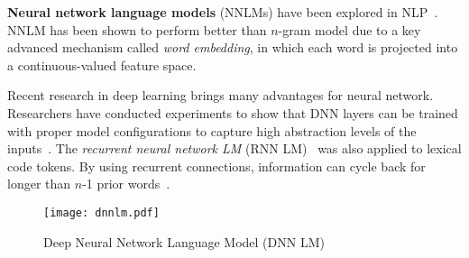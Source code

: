 


{\bf Neural network language models} (NNLMs) have been explored in
NLP~\cite{bengio03,schwenk05, schwenk07,mikolov11,mikolov10,
  sarikaya09}. NNLM has been shown to perform better than $n$-gram
model due to a key advanced mechanism called {\em word embedding}, in
which each word is projected into a continuous-valued feature
space. 
%
%
%

Recent research in deep learning brings many advantages for neural
network. Researchers have conducted experiments to show that DNN
layers can be trained with proper model configurations to capture high
abstraction levels of the
inputs~\cite{mikolov11,mikolov10,le-taslp13,DNNLM12,schwenk05}.
%
%
The {\em
recurrent neural network LM} (RNN
LM)~\cite{mikolov10,hermans13,pascanuGCB13} was also applied to lexical code
tokens. 
%
By using recurrent connections, information can cycle back for longer
than $n$-1 prior words~\cite{mikolov10}. 

\begin{figure}[t]
\centering
\texttt{[image: dnnlm.pdf]} %
\caption{Deep Neural Network Language Model (DNN LM)~\cite{DNNLM12}}
\label{dnnlmfig}
\end{figure}
